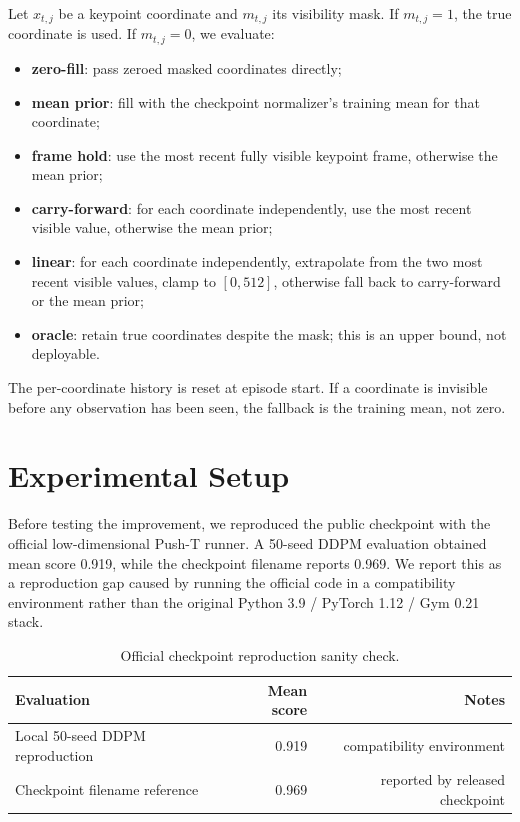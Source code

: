 \documentclass{article}
\begin{document}
Let $x_{t,j}$ be a keypoint coordinate and $m_{t,j}$ its visibility mask. If $m_{t,j}=1$, the true coordinate is used. If $m_{t,j}=0$, we evaluate:
\begin{itemize}
\item \textbf{zero-fill}: pass zeroed masked coordinates directly;
\item \textbf{mean prior}: fill with the checkpoint normalizer's training mean for that coordinate;
\item \textbf{frame hold}: use the most recent fully visible keypoint frame, otherwise the mean prior;
\item \textbf{carry-forward}: for each coordinate independently, use the most recent visible value, otherwise the mean prior;
\item \textbf{linear}: for each coordinate independently, extrapolate from the two most recent visible values, clamp to $[0,512]$, otherwise fall back to carry-forward or the mean prior;
\item \textbf{oracle}: retain true coordinates despite the mask; this is an upper bound, not deployable.
\end{itemize}

The per-coordinate history is reset at episode start. If a coordinate is invisible before any observation has been seen, the fallback is the training mean, not zero.

\section{Experimental Setup}

Before testing the improvement, we reproduced the public checkpoint with the official low-dimensional Push-T runner. A 50-seed DDPM evaluation obtained mean score 0.919, while the checkpoint filename reports 0.969. We report this as a reproduction gap caused by running the official code in a compatibility environment rather than the original Python 3.9 / PyTorch 1.12 / Gym 0.21 stack.

\begin{table}[t]
\centering
\caption{Official checkpoint reproduction sanity check.}
\begin{tabular}{lrr}
\toprule
Evaluation & Mean score & Notes \\
\midrule
Local 50-seed DDPM reproduction & 0.919 & compatibility environment \\
Checkpoint filename reference & 0.969 & reported by released checkpoint \\
\bottomrule
\end{tabular}
\end{table}
\end{document}

